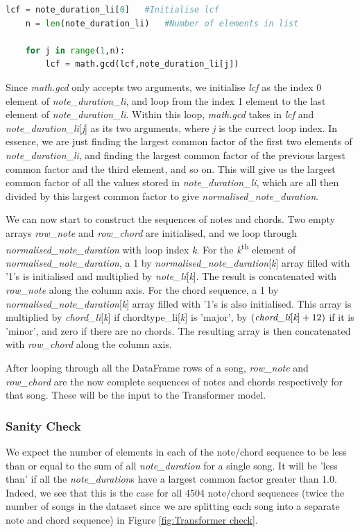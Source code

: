 \begin{lstlisting}[language=Python]
    lcf = note_duration_li[0]   #Initialise lcf
    n = len(note_duration_li)   #Number of elements in list
    
    for j in range(1,n):
        lcf = math.gcd(lcf,note_duration_li[j])
\end{lstlisting}


Since \emph{math.gcd} only accepts two arguments, we initialise \emph{lcf} as the index 0 element of \emph{note\_duration\_li}, and loop from the index 1 element to the last element of \emph{note\_duration\_li}. Within this loop, \emph{math.gcd} takes in \emph{lcf} and \emph{note\_duration\_li}[\emph{j}] as its two arguments, where \emph{j} is the currect loop index. In essence, we are just finding the largest common factor of the first two elements of \emph{note\_duration\_li}, and finding the largest common factor of the previous largest common factor and the third element, and so on. This will give us the largest common factor of all the values stored in \emph{note\_duration\_li}, which are all then divided by this largest common factor to give \emph{normalised\_note\_duration}.

We can now start to construct the sequences of notes and chords. Two empty arrays \emph{row\_note} and \emph{row\_chord} are initialised, and we loop through \emph{normalised\_note\_duration} with loop index \emph{k}. For the \emph{k}\textsuperscript{th} element of \emph{normalised\_note\_duration}, a 1 by \emph{normalised\_note\_duration}[\emph{k}] array filled with '1's is initialised and multiplied by \emph{note\_li}[\emph{k}]. The result is concatenated with \emph{row\_note} along the column axis. For the chord sequence, a 1 by \emph{normalised\_note\_duration}[\emph{k}] array filled with '1's is also initialised. This array is multiplied by \emph{chord\_li}[\emph{k}] if chordtype\_li[\emph{k}] is 'major', by $(\emph{chord\_li}[\emph{k}] + 12)$ if it is 'minor', and zero if there are no chords. The resulting array is then concatenated with \emph{row\_chord} along the column axis.

After looping through all the DataFrame rows of a song, \emph{row\_note} and \emph{row\_chord} are the now complete sequences of notes and chords respectively for that song. These will be the input to the Transformer model.

\subsubsection{Sanity Check}
We expect the number of elements in each of the note/chord sequence to be less than or equal to the sum of all \emph{note\_duration} for a single song. It will be 'less than' if all the \emph{note\_duration}s have a largest common factor greater than 1.0. Indeed, we see that this is the case for all 4504 note/chord sequences (twice the number of songs in the dataset since we are splitting each song into a separate note and chord sequence) in Figure \ref{fig:Transformer check}.

